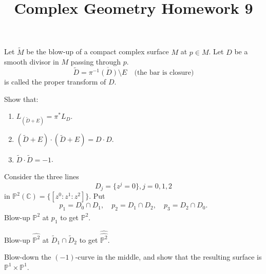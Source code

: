 \documentclass[12pt]{article}
\title{Complex Geometry Homework 9}
\author{}
\date{}
\begin{document}
\maketitle
\begin{problem}
  Let \(\tilde{M}\) be the blow-up of a compact complex surface \(M\) at \(p\in M\).
  Let \(D\) be a smooth divisor in \(M\) passing through \(p\). \[
    \tilde{D}=\overline{\pi^{-1}(D)\setminus E}\quad
    \text{(the bar is closure)}
  \] is called the proper transform of \(D\).
  \begin{center}
    
  \end{center}
  Show that:
  \begin{enumerate}[(1)]
  \item \(L_{(\tilde{D}+E)}=\pi^* L_D\).
  \item \((\tilde{D}+E)\cdot (\tilde{D}+E)=D\cdot D\).
  \item \(\tilde{D}\cdot \tilde{D}=-1\).
  \end{enumerate}
\end{problem}
\begin{problem}
  Consider the three lines \[
    D_j=\{z^j=0\},j=0,1,2
  \] in \(\mathbb{P}^2(\mathbb{C})=\{[z^0:z^1:z^2]\}\). Put \[
    p_1=D_0\cap D_1,\quad p_2=D_1\cap D_2,\quad p_3=D_2\cap D_0
  .\] Blow-up \(\mathbb{P}^2\) at \(p_1\) to get \(\widehat{\mathbb{P}^2}\).
  \begin{center}
    
  \end{center}
  Blow-up \(\widehat{\mathbb{P}^2}\) at \(\tilde{D}_1\cap \tilde{D}_2\) to get
  \(\widehat{\widehat{\mathbb{P}^2}}\).
  \begin{center}
    
  \end{center}
  Blow-down the \((-1)\)-curve in the middle, and show that the resulting surface is
  \(\mathbb{P}^1\times \mathbb{P}^1\).
  \begin{center}
    
  \end{center}
\end{problem}
\end{document}
